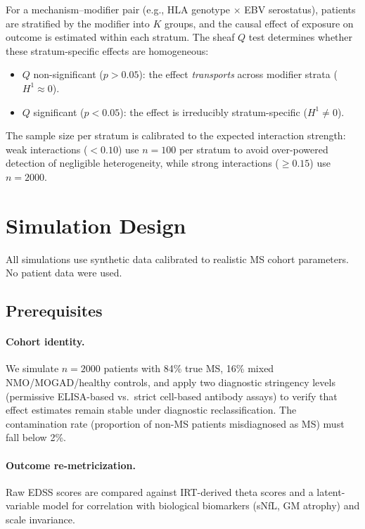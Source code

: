 \documentclass[11pt]{article}
\begin{document}
For a mechanism--modifier pair (e.g., HLA genotype $\times$ EBV
serostatus), patients are stratified by the modifier into $K$ groups, and
the causal effect of exposure on outcome is estimated within each
stratum. The sheaf $Q$ test determines whether these stratum-specific
effects are homogeneous:
\begin{itemize}
\item $Q$ non-significant ($p > 0.05$): the effect \emph{transports}
  across modifier strata ($H^1 \approx 0$).
\item $Q$ significant ($p < 0.05$): the effect is irreducibly
  stratum-specific ($H^1 \neq 0$).
\end{itemize}
The sample size per stratum is calibrated to the expected interaction
strength: weak interactions ($< 0.10$) use $n = 100$ per stratum to
avoid over-powered detection of negligible heterogeneity, while strong
interactions ($\geq 0.15$) use $n = 2000$.

\section{Simulation Design}

All simulations use synthetic data calibrated to realistic MS cohort
parameters. No patient data were used.

\subsection{Prerequisites}

\paragraph{Cohort identity.}
We simulate $n = 2000$ patients with 84\% true MS, 16\% mixed
NMO/MOGAD/healthy controls, and apply two diagnostic stringency levels
(permissive ELISA-based vs.\ strict cell-based antibody assays) to verify
that effect estimates remain stable under diagnostic reclassification.
The contamination rate (proportion of non-MS patients misdiagnosed as MS)
must fall below 2\%.

\paragraph{Outcome re-metricization.}
Raw EDSS scores are compared against IRT-derived theta scores and a
latent-variable model for correlation with biological biomarkers (sNfL,
GM atrophy) and scale invariance.
\end{document}
